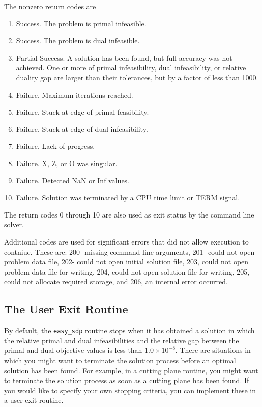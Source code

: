 \documentclass{article}
\begin{document}
The nonzero return codes are
\begin{enumerate}
\item Success.  The problem is primal infeasible. 
\item Success.  The problem is dual infeasible.
\item Partial Success.  A solution has been found, but full accuracy was
not achieved.  One or more of primal infeasibility, dual infeasibility, 
or relative duality gap are larger than their tolerances, but by a factor
of less than 1000.
\item Failure.  Maximum iterations reached.
\item Failure.  Stuck at edge of primal feasibility.
\item Failure.  Stuck at edge of dual infeasibility.
\item Failure.  Lack of progress.
\item Failure.  X, Z, or O was singular.
\item Failure.  Detected NaN or Inf values.
\item Failure.  Solution was terminated by a CPU time limit or TERM signal.
\end{enumerate}

The return codes 0 through 10 are also used as exit status by the command
line solver.

Additional codes are used for significant errors that did not allow execution
to contniue.  These are: 200- missing command line arguments, 201- could not
open problem data file, 202- could not open initial solution file, 203, could
not open problem data file for writing, 204, could not open solution file for
writing, 205, could not allocate required storage, and 206, an internal
error occurred.

\subsection*{The User Exit Routine}
By default, the {\tt easy\_sdp} routine stops when it has obtained a
solution in which the relative primal and dual infeasibilities and the
relative gap between the primal and dual objective values is less than
$1.0 \times 10^{-8}$.  There are situations in which you might want to
terminate the solution process before an optimal solution has been
found.  For example, in a cutting plane routine, you might want to
terminate the solution process as soon as a cutting plane has been
found.  If you would like to specify your own stopping criteria, you
can implement these in a user exit routine.
\end{document}
